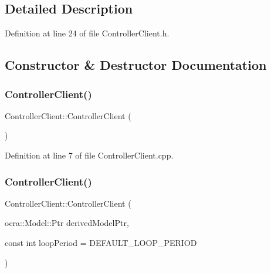 \subsection{Detailed Description}


Definition at line 24 of file Controller\+Client.\+h.



\subsection{Constructor \& Destructor Documentation}
\hypertarget{classocra__recipes_1_1ControllerClient_acbddf372a61ee0cd20aa417527a56606}{}\label{classocra__recipes_1_1ControllerClient_acbddf372a61ee0cd20aa417527a56606} 
\subsubsection{\texorpdfstring{Controller\+Client()}{ControllerClient()}\hspace{0.1cm}{\footnotesize\ttfamily [1/2]}}
{\footnotesize\ttfamily Controller\+Client\+::\+Controller\+Client (\begin{DoxyParamCaption}{ }\end{DoxyParamCaption})}



Definition at line 7 of file Controller\+Client.\+cpp.

\hypertarget{classocra__recipes_1_1ControllerClient_acece74d9360b3f5508d26479f49fc3c2}{}\label{classocra__recipes_1_1ControllerClient_acece74d9360b3f5508d26479f49fc3c2} 
\subsubsection{\texorpdfstring{Controller\+Client()}{ControllerClient()}\hspace{0.1cm}{\footnotesize\ttfamily [2/2]}}
{\footnotesize\ttfamily Controller\+Client\+::\+Controller\+Client (\begin{DoxyParamCaption}\item[{ocra\+::\+Model\+::\+Ptr}]{derived\+Model\+Ptr,  }\item[{const int}]{loop\+Period = {\ttfamily DEFAULT\+\_\+LOOP\+\_\+PERIOD} }\end{DoxyParamCaption})}



